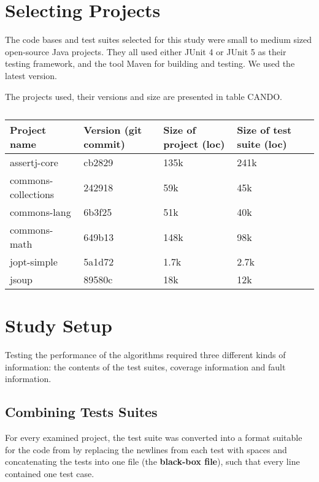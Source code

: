 \section{Selecting Projects}

The code bases and test suites selected for this study were small to
medium sized open-source Java projects. They all used either JUnit
4 or JUnit 5 as their testing framework, and the tool Maven %
for building and testing. We used the latest version.

The projects used, their versions and size are presented in table CANDO.

\begin{table}[htpb]
	\caption[]{}\label{tab:projects} %
	\centering
	\begin{tabular}{l l l l l}
		\toprule
		Project name & Version (git commit) & Size of project (loc) & Size of test suite (loc) \\
		\midrule
		assertj-core & cb2829 & 135k & 241k \\
		commons-collections & 242918 & 59k & 45k \\
		commons-lang & 6b3f25 & 51k & 40k \\
		commons-math & 649b13 & 148k & 98k \\
		jopt-simple & 5a1d72 & 1.7k & 2.7k \\
		jsoup & 89580c & 18k & 12k \\
		\bottomrule
	\end{tabular}
\end{table}

\section{Study Setup}

Testing the performance of the algorithms required three different kinds
of information: the contents of the test suites, coverage information
and fault information.

\subsection{Combining Tests Suites}

For every examined project, the test suite was converted into a format
suitable for the code from \cite{cruciani2019scalable} by replacing the
newlines from each test with spaces and concatenating the tests into
one file (the \textbf{black-box file}), such that every line contained
one test case.

